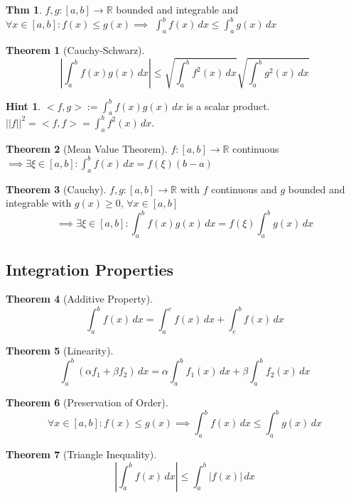 \documentclass[a4paper, 10pt]{article}
\theoremstyle{definition}
\newtheorem*{theorem}{Thm}
\newtheorem*{note_wrapper}{Hint}
\theoremstyle{ex}
\theoremstyle{named}
\newtheorem*{ntheorem_wrapper}{Theorem}
\newenvironment{ntheorem}%
    {\begin{mdframed}[style=important]\begin{ntheorem_wrapper}}%
    {\end{ntheorem_wrapper}\end{mdframed}}
\newenvironment{note}%
    {\begin{mdframed}[style=trick]\begin{note_wrapper}}%
    {\end{note_wrapper}\end{mdframed}}
\newcommand{\R}{\mathbb{R}}
\begin{document}
\begin{theorem}
    $f, g: [a, b] \to \R$ bounded and integrable and \\
    $\forall x \in [a, b]: f(x) \leq g(x) \implies$
    $\int_a^b f(x) \,dx \leq \int_a^b g(x) \,dx$
\end{theorem}

\begin{ntheorem}[Cauchy-Schwarz]
    $$\left|\int_a^b f(x)g(x) \,dx\right| \leq \sqrt{\int_a^b f^2(x) \,dx}\sqrt{\int_a^b g^2(x) \,dx}$$
\end{ntheorem}

\begin{note}
    $<f, g> := \int_a^b f(x)g(x) \,dx$ is a scalar product. \\
    $||f||^2 = <f, f> = \int_a^b f^2(x) \,dx$.
\end{note}

\begin{ntheorem}[Mean Value Theorem]
    $f: [a, b] \to \R$ continuous $\implies \exists \xi \in [a, b]: \int_a^b f(x) \,dx = f(\xi)(b - a)$
\end{ntheorem}

\begin{ntheorem}[Cauchy]
    $f, g: [a, b] \to \R$ with $f$ continuous and $g$ bounded and integrable with $g(x) \geq 0$, $\forall x \in [a, b]$
    $$\implies \exists \xi \in [a, b]: \int_a^b f(x)g(x) \,dx = f(\xi)\int_a^b g(x) \,dx$$
\end{ntheorem}

\subsection{Integration Properties}
\begin{ntheorem}[Additive Property]
    $$\int_a^b f(x) \,dx = \int_a^c f(x) \,dx + \int_c^b f(x) \,dx$$
\end{ntheorem}

\begin{ntheorem}[Linearity]
    $$\int_a^b(\alpha f_1 + \beta f_2) \,dx = \alpha \int_a^b f_1(x) \,dx + \beta \int_a^b f_2(x) \,dx$$
\end{ntheorem}

\begin{ntheorem}[Preservation of Order]
    $$\forall x \in [a, b]: f(x) \leq g(x) \implies \int_a^b f(x) \,dx \leq \int_a^b g(x) \,dx$$
\end{ntheorem}

\begin{ntheorem}[Triangle Inequality]
    $$\left|\int_a^b f(x) \,dx\right| \leq \int_a^b |f(x)| \,dx$$
\end{ntheorem}
\end{document}
